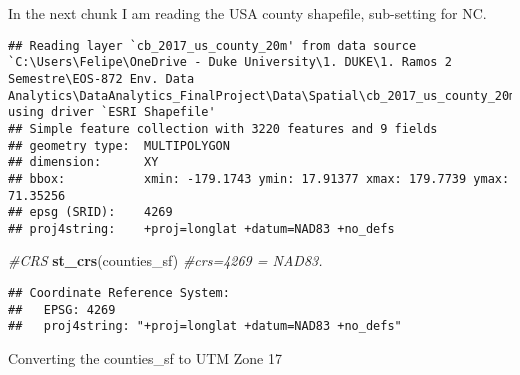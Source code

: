 \documentclass[12pt,]{article}
\newenvironment{Shaded}{\begin{snugshade}}{\end{snugshade}}
\newcommand{\KeywordTok}[1]{\textcolor[rgb]{0.13,0.29,0.53}{\textbf{#1}}}
\newcommand{\DataTypeTok}[1]{\textcolor[rgb]{0.13,0.29,0.53}{#1}}
\newcommand{\DecValTok}[1]{\textcolor[rgb]{0.00,0.00,0.81}{#1}}
\newcommand{\StringTok}[1]{\textcolor[rgb]{0.31,0.60,0.02}{#1}}
\newcommand{\CommentTok}[1]{\textcolor[rgb]{0.56,0.35,0.01}{\textit{#1}}}
\newcommand{\OperatorTok}[1]{\textcolor[rgb]{0.81,0.36,0.00}{\textbf{#1}}}
\newcommand{\NormalTok}[1]{#1}
\begin{document}
In the next chunk I am reading the USA county shapefile, sub-setting for
NC.

\begin{Shaded}
\end{Shaded}

\begin{verbatim}
## Reading layer `cb_2017_us_county_20m' from data source `C:\Users\Felipe\OneDrive - Duke University\1. DUKE\1. Ramos 2 Semestre\EOS-872 Env. Data Analytics\DataAnalytics_FinalProject\Data\Spatial\cb_2017_us_county_20m.shp' using driver `ESRI Shapefile'
## Simple feature collection with 3220 features and 9 fields
## geometry type:  MULTIPOLYGON
## dimension:      XY
## bbox:           xmin: -179.1743 ymin: 17.91377 xmax: 179.7739 ymax: 71.35256
## epsg (SRID):    4269
## proj4string:    +proj=longlat +datum=NAD83 +no_defs
\end{verbatim}

\begin{Shaded}
\begin{Highlighting}[]
\CommentTok{#CRS}
\KeywordTok{st_crs}\NormalTok{(counties_sf) }\CommentTok{#crs=4269 = NAD83.}
\end{Highlighting}
\end{Shaded}

\begin{verbatim}
## Coordinate Reference System:
##   EPSG: 4269 
##   proj4string: "+proj=longlat +datum=NAD83 +no_defs"
\end{verbatim}

Converting the counties\_sf to UTM Zone 17

\begin{Shaded}
\end{Shaded}
\end{document}
